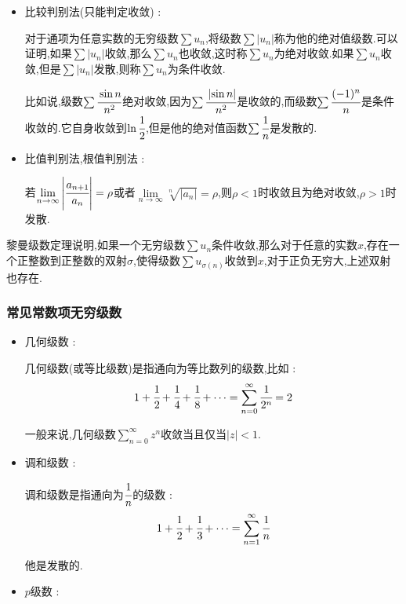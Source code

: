 \documentclass[UTF8,12pt]{ctexbook}
\newcommand{\limNormal}[1]{\lim\limits_{#1}}
\newcommand{\upDownSum}[2]{\sum\limits_{#2}^{#1}}
\newcommand{\absoluteValue}[1]{\left\lvert #1 \right\vert}
\newcommand{\sumSeries}{\upDownSum{\infty}{n = 1}}
\begin{document}
{{{{{    \begin{itemize}
      \item {
            比较判别法(只能判定收敛) :

            对于通项为任意实数的无穷级数$\sum u_n$,将级数$\sum \absoluteValue{u_n}$称为他的绝对值级数.可以证明,如果$\sum \absoluteValue{u_n}$收敛,那么$\sum u_n$也收敛,这时称$\sum u_n$为绝对收敛.如果$\sum u_n$收敛,但是$\sum \absoluteValue{u_n}$发散,则称$\sum u_n$为条件收敛.

            比如说,级数$\sum \cfrac{\sin n}{n^2}$绝对收敛,因为$\sum \cfrac{\absoluteValue{\sin n}}{n^2}$是收敛的,而级数$\sum \cfrac{(-1)^n}{n}$是条件收敛的.它自身收敛到$\ln\cfrac{1}{2}$,但是他的绝对值函数$\sum \cfrac{1}{n}$是发散的.
            }
      \item {
            比值判别法,根值判别法 :

            若$\limNormal{n \to \infty} \absoluteValue{\cfrac{a_{n + 1}}{a_n}} = \rho$或者$\limNormal{n \to \infty}\sqrt[n]{\absoluteValue{a_n}} = \rho$,则$\rho < 1$时收敛且为绝对收敛,$\rho > 1$时发散.
            }
    \end{itemize}

    黎曼级数定理说明,如果一个无穷级数$\sum u_n$条件收敛,那么对于任意的实数$x$,存在一个正整数到正整数的双射$\sigma$,使得级数$\sum u_{\sigma(n)}$收敛到$x$,对于正负无穷大,上述双射也存在.
  }%

  \subsubsection{常见常数项无穷级数}{

    \begin{itemize}
      \item {
            几何级数 :

            几何级数(或等比级数)是指通向为等比数列的级数,比如 :
            $$
              1 + \cfrac{1}{2} + \cfrac{1}{4} + \cfrac{1}{8} + \dots = \upDownSum{\infty}{n = 0} \cfrac{1}{2^n} = 2
            $$

            一般来说,几何级数$\upDownSum{\infty}{n = 0}z^n$收敛当且仅当$\absoluteValue{z} < 1$.
            }
      \item{
            调和级数 :

            调和级数是指通向为$\cfrac{1}{n}$的级数 :
            $$
              1 + \cfrac{1}{2} + \cfrac{1}{3} + \dots = \sumSeries \cfrac{1}{n}
            $$

            他是发散的.
            }
      \item{
            $p$级数 :

}
\end{itemize}}}}}}
\end{document}
